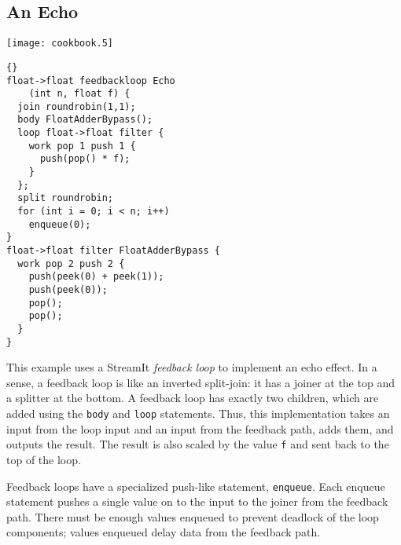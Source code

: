 \clearpage
\subsection{An Echo}

\begin{textpic}{\texttt{[image: cookbook.5]}}
\begin{lstlisting}{}
float->float feedbackloop Echo
    (int n, float f) {
  join roundrobin(1,1);
  body FloatAdderBypass();
  loop float->float filter {
    work pop 1 push 1 {
      push(pop() * f);
    }
  };
  split roundrobin;
  for (int i = 0; i < n; i++)
    enqueue(0);
}
float->float filter FloatAdderBypass {
  work pop 2 push 2 {
    push(peek(0) + peek(1));
    push(peek(0));
    pop();
    pop();
  }
}
\end{lstlisting}
\end{textpic}

This example uses a StreamIt \emph{feedback loop} to implement an echo
effect.  In a sense, a feedback loop is like an inverted split-join:
it has a joiner at the top and a splitter at the bottom.  A feedback
loop has exactly two children, which are added using the \lstinline|body|
and \lstinline|loop| statements.  Thus, this implementation takes an
input from the loop input and an input from the feedback path, adds
them, and outputs the result.  The result is also scaled by the value
\lstinline|f| and sent back to the top of the loop.

Feedback loops have a specialized push-like statement,
\lstinline|enqueue|.  Each enqueue statement pushes a single value on
to the input to the joiner from the feedback path.  There must be
enough values enqueued to prevent deadlock of the loop components;
values enqueued delay data from the feedback path.

